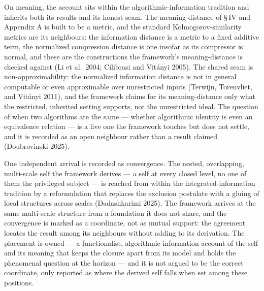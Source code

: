 \documentclass[11pt,oneside]{report}
\theoremstyle{definition}
\theoremstyle{remark}
\begin{document}
On meaning, the account sits within the algorithmic-information tradition and inherits both its results and its honest seam. The meaning-distance of \S\,IV and Appendix A is built to be a metric, and the standard Kolmogorov-similarity metrics are its neighbours: the information distance is a metric to a fixed additive term, the normalized compression distance is one insofar as its compressor is normal, and these are the constructions the framework's meaning-distance is checked against (Li et al.\ 2004; Cilibrasi and Vit\'anyi 2005). The shared seam is non-approximability: the normalized information distance is not in general computable or even approximable over unrestricted inputs (Terwijn, Torenvliet, and Vit\'anyi 2011), and the framework claims for its meaning-distance only what the restricted, inherited setting supports, not the unrestricted ideal. The question of when two algorithms are the same --- whether algorithmic identity is even an equivalence relation --- is a live one the framework touches but does not settle, and it is recorded as an open neighbour rather than a result claimed (Doubrovinski 2025).

One independent arrival is recorded as convergence. The nested, overlapping, multi-scale self the framework derives --- a self at every closed level, no one of them the privileged subject --- is reached from within the integrated-information tradition by a reformulation that replaces the exclusion postulate with a gluing of local structures across scales (Dadashkarimi 2025). The framework arrives at the same multi-scale structure from a foundation it does not share, and the convergence is marked as a coordinate, not as mutual support: the agreement locates the result among its neighbours without adding to its derivation. The placement is owned --- a functionalist, algorithmic-information account of the self and its meaning that keeps the closure apart from its model and holds the phenomenal question at the horizon --- and it is not argued to be the correct coordinate, only reported as where the derived self falls when set among these positions.
\end{document}
